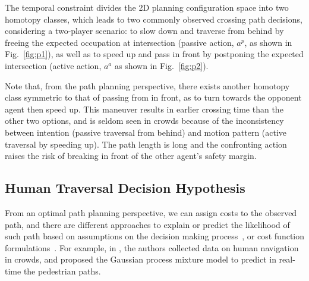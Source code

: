 \documentclass[conference]{IEEEtran}
\begin{document}
The temporal constraint divides the 2D planning configuration space into two 
homotopy classes, which leads to two commonly observed crossing path decisions, 
considering a two-player scenario: to slow down and traverse from behind by 
freeing the expected occupation at intersection (passive action, $a^{p}$, as 
shown in Fig.~\ref{fig:p1}), as well as to speed up and pass in front by postponing 
the expected intersection (active action, $a^a$ as shown in Fig.~\ref{fig:p2}).

Note that, from the path planning perspective, there exists another homotopy 
class symmetric to that of passing from in front, as to turn towards the 
opponent agent then speed up.
This maneuver results in earlier crossing time than the other two options, and 
is seldom seen in crowds because of the inconsistency between intention 
(passive traversal from behind) and motion pattern (active traversal by 
speeding up). The path length is long and the confronting action raises the 
risk of breaking in front of the other agent's safety margin. 
\vspace{-.2em}
\subsection{Human Traversal Decision Hypothesis} 
From an optimal path planning perspective, we can assign costs to 
the observed path, and there are different approaches to explain or predict 
the likelihood of such path based on assumptions on the decision making 
process~\cite{ratliff2006maximum, ziebart2008maximum}, or cost function 
formulations~\cite{kruse2012legible}. For example, in 
\cite{trautman2010unfreezing}, the authors collected data on human 
navigation in crowds, and proposed the Gaussian 
process mixture model to predict in real-time the pedestrian paths. 
\end{document}
